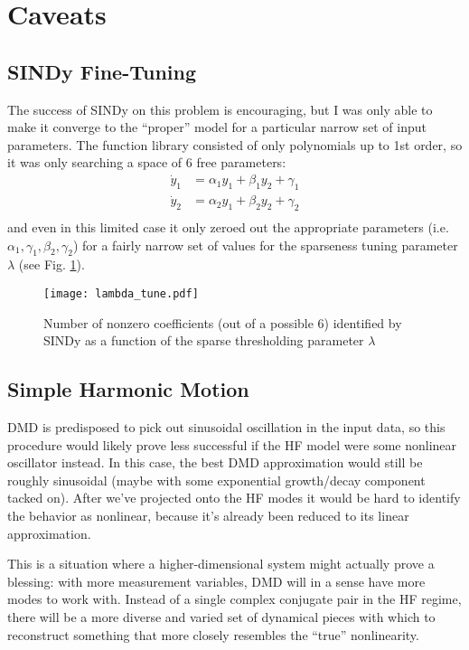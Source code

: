 \documentclass[11pt]{article} %
\begin{document}
\section{Caveats}
\subsection{SINDy Fine-Tuning}
The success of SINDy on this problem is encouraging, but I was only able to make it converge to the ``proper'' model for a particular narrow set of input parameters. The function library consisted of only polynomials up to 1st order, so it was only searching a space of 6 free parameters:
\begin{equation}
\begin{split}
\dot{y}_1 &= \alpha_1 y_1 + \beta_1 y_2 + \gamma_1\\
\dot{y}_2 &= \alpha_2 y_1 + \beta_2 y_2 + \gamma_2\\
\end{split}
\end{equation}
and even in this limited case it only zeroed out the appropriate parameters (i.e. $\alpha_1, \gamma_1, \beta_2, \gamma_2$) for a fairly narrow set of values for the sparseness tuning parameter $\lambda$ (see Fig. \ref{fig:lambda_tune}).
\begin{figure}
\centering
\texttt{[image: lambda\_tune.pdf]}
\caption{Number of nonzero coefficients (out of a possible 6) identified by SINDy as a function of the sparse thresholding parameter $\lambda$}
\label{fig:lambda_tune}
\end{figure}

\subsection{Simple Harmonic Motion}
DMD is predisposed to pick out sinusoidal oscillation in the input data, so this procedure would likely prove less successful if the HF model were some nonlinear oscillator instead. In this case, the best DMD approximation would still be roughly sinusoidal (maybe with some exponential growth/decay component tacked on). After we've projected onto the HF modes it would be hard to identify the behavior as nonlinear, because it's already been reduced to its linear approximation.

This is a situation where a higher-dimensional system might actually prove a blessing: with more measurement variables, DMD will in a sense have more modes to work with. Instead of a single complex conjugate pair in the HF regime, there will be a more diverse and varied set of dynamical pieces with which to reconstruct something that more closely resembles the ``true'' nonlinearity.
\end{document}
